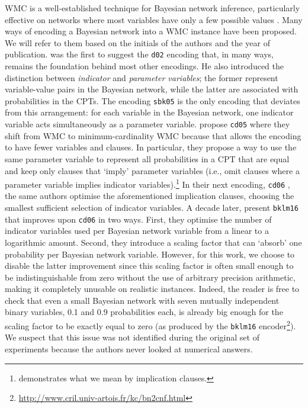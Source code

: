 WMC is a well-established technique for Bayesian network inference, particularly
effective on networks where most variables have only a few possible values
\citep{DBLP:conf/kr/Darwiche02}. Many ways of encoding a Bayesian network into a
WMC instance have been proposed. We will refer to them based on the initials of
the authors and the year of publication.  was the first to suggest the
\texttt{d02} encoding that, in many ways, remains
the foundation behind most other encodings. He also introduced the distinction
between \emph{indicator} and \emph{parameter variables}; the former represent
variable-value pairs in the Bayesian network, while the latter are associated
with probabilities in the CPTs. The encoding \texttt{sbk05}
\citep{DBLP:conf/aaai/SangBK05} is the only encoding that deviates from this
arrangement: for each variable in the Bayesian network, one indicator variable
acts simultaneously as a parameter variable.  propose
\texttt{cd05} where they shift from WMC to
minimum-cardinality WMC because that allows the encoding to have fewer variables
and clauses. In particular, they propose a way to use the same parameter
variable to represent all probabilities in a CPT that are equal and keep only
clauses that `imply' parameter variables (i.e., omit clauses where a parameter
variable implies indicator variables).\footnote{ demonstrates
  what we mean by implication clauses.} In their next encoding, \texttt{cd06}
\citep{DBLP:conf/sat/ChaviraD06}, the same authors optimise the aforementioned
implication clauses, choosing the smallest sufficient selection of indicator
variables. A decade later, \citet{DBLP:conf/ecai/BartKLM16} present \texttt{bklm16} that improves upon \texttt{cd06} in two ways.
First, they optimise the number of indicator variables used per Bayesian network
variable from a linear to a logarithmic amount. Second, they introduce a scaling
factor that can `absorb' one probability per Bayesian network variable. However,
for this work, we choose to disable the latter improvement since this scaling
factor is often small enough to be indistinguishable from zero without the use
of arbitrary precision arithmetic, making it completely unusable on realistic
instances. Indeed, the reader is free to check that even a small Bayesian
network with seven mutually independent binary variables, 0.1 and 0.9
probabilities each, is already big enough for the scaling factor to be exactly
equal to zero (as produced by the \texttt{bklm16}
encoder\footnote{\url{http://www.cril.univ-artois.fr/kc/bn2cnf.html}}). We
suspect that this issue was not identified during the original set of
experiments because the authors never looked at numerical answers.

